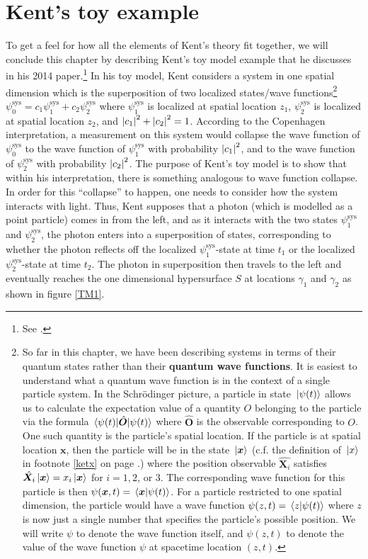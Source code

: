 \section{Kent's toy example}\label{toysection}
To get a feel for how all the elements of Kent's theory fit together, we will conclude this chapter by describing Kent's toy model example that he discusses in his 2014 paper.\footnote{See \cite[p. 3--4]{Kent2014}.} In his toy model, Kent considers a system in one spatial dimension which is the superposition of two localized states/wave functions\footnote{So far in this chapter, we have been describing systems in terms of their quantum states rather than their \textbf{quantum wave functions}.\label{wavefunctionfootnote} It is easiest to understand what a quantum wave function is in the context of a single particle system. In the Schr\"{o}dinger picture, a particle in state $\ket*{\psi(t)}$ allows us to calculate the expectation value of a quantity $O$ belonging to the particle via the formula $\ev{\hat{\bm{O}}}{\psi(t)}$ where $\hat{\bm{O}}$ is the observable corresponding to $O$. One such quantity is the particle's spatial location. If the particle is at spatial location $\bm{x}$, then the particle will be in the state $\ket*{\bm{x}}$ (c.f. the definition of $\ket*{x}$ in footnote \ref{ketx} on page \pageref{ketx}.) where the position observable $\hat{\bm{X}_i}$ satisfies $\hat{\bm{X}_i}\ket*{\bm{x}}=x_i\ket*{\bm{x}}$ for $i=1,2$, or $3$. The corresponding wave function for this particle is then   $\psi(\bm{x}, t)=\ip*{\bm{x}}{\psi(t)}$. For a particle restricted to one spatial dimension, the particle would have a wave function $\psi(z, t)=\ip*{z}{\psi(t)}$ where $z$ is now just a single number that specifies the particle's possible position. We will write $\psi$ to denote the wave function itself, and $\psi(z,t)$ to denote the value of the wave function $\psi$ at spacetime location $(z,t)$.}  $\psi_0^\text{sys}=c_1 \psi_1^\text{sys}+c_2\psi_2^\text{sys}$ where $\psi_1^\text{sys}$ is localized at spatial location $z_1$, $\psi_2^\text{sys}$ is localized at spatial location $z_2$, and $\abs{c_1}^2+\abs{c_2}^2=1$. According to the Copenhagen interpretation, a measurement on this system would collapse the wave function of $\psi_0^\text{sys}$ to the wave function of $\psi_1^\text{sys}$ with probability $\abs{c_1}^2$, and to the wave function of $\psi_2^\text{sys}$ with probability $\abs{c_2}^2$. The purpose of Kent's toy model is to show that within his interpretation, there is something analogous to wave function collapse.  In order for this ``collapse'' to happen, one needs to consider how the system interacts with light. Thus, Kent supposes that a photon (which is modelled as a point particle) comes in from the left, and as it interacts with the two states $\psi_1^\text{sys}$ and $\psi_2^\text{sys}$, the photon enters into a superposition of states, corresponding to whether the photon reflects off the localized $\psi_1^\text{sys}$-state at time $t_1$ or the localized $\psi_2^\text{sys}$-state at time $t_2$. The photon in superposition then travels to the left and eventually reaches the one dimensional hypersurface $S$ at locations $\gamma_1$ and $\gamma_2$ as shown in figure  \ref{TM1}.

